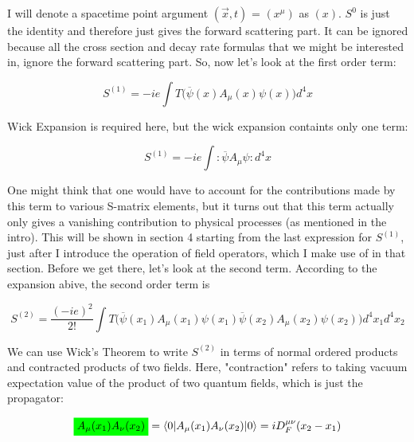 \documentclass[a4]{article}
\newcommand{\highlight}[2][yellow]{\mathchoice
  {\colorbox{#1}{$\displaystyle#2$}}
  {\colorbox{#1}{$\textstyle#2$}}
  {\colorbox{#1}{$\scriptstyle#2$}}
  {\colorbox{#1}{$\scriptscriptstyle#2$}}}
\begin{document}
        I will denote a spacetime point argument $(\vec{x}, t)$ = $(x^{\mu})$ as $(x)$. $S^{0}$ is just the identity and therefore just gives the forward scattering part. It can be ignored because all the cross section and decay rate formulas
        that we might be interested in, ignore the forward scattering part. So, now let's look at the first order term:

        \begin{equation}
            S^{(1)} = - i e \int T \Big( \overline{\psi} (x) A_{\mu} (x) \psi (x) \Big) d^{4} x
        \end{equation}

        Wick Expansion is required here, but the wick expansion containts only one term:
        
        \begin{equation}
            S^{(1)} = - i e \int :\overline{\psi} A_{\mu} \psi: d^{4} x
        \end{equation}

        One might think that one would have to account for the contributions made by this term to various S-matrix elements, but it turns out that this term actually only gives a vanishing contribution to physical processes (as mentioned in the intro). This will be shown
        in section 4 starting from the last expression for $S^{(1)}$, just after I introduce the operation of field operators, which I make use of in that section. Before we get there, let's look at the second term. According to the expansion abive, the second order term
        is 

        \begin{equation}
            S^{(2)} = \frac{(-ie)^2}{2!} \int T \Big( \overline{\psi} (x_1) A_{\mu} (x_1) \psi (x_1) \overline{\psi} (x_2) A_{\mu} (x_2) \psi (x_2) \Big) d^{4} x_{1} d^{4} x_{2}
        \end{equation}

        We can use Wick's Theorem to write $S^{(2)}$ in terms of normal ordered products and contracted products of two fields. Here, "contraction" refers to taking vacuum expectation value of the product
        of two quantum fields, which is just the propagator:

        \begin{equation}
            \highlight[green]{A_{\mu} (x_1) A_{\nu} (x_2)} = \braket{0|A_{\mu} (x_1) A_{\nu} (x_2)|0} = i D_{F}^{\mu\nu} (x_2 - x_1)
        \end{equation}
\end{document}
